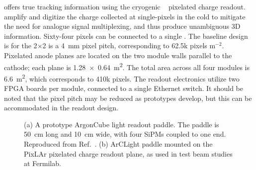  offers true \threed tracking information using the  cryogenic ~\cite{larpix} pixelated charge readout.   amplify and digitize the charge collected at single-pixels in the cold to mitigate the need for analogue signal multiplexing, and thus produce unambiguous 3D information. Sixty-four pixels can be connected to a single  . The baseline design is for the 2$\times$2 is a \SI{4}{\milli\metre} pixel pitch, corresponding to 62.5k pixels m$^{-2}$. Pixelated anode planes are located on the two module walls parallel to the cathode; each plane is \SI[product-units=repeat]{1.28x0.64}{\metre\squared}. The total area across all four modules is \SI{6.6}{\metre\squared}, which corresponds to 410k pixels. The readout electronics utilize two FPGA boards per module, connected to a single Ethernet switch. It should be noted that the pixel pitch may be reduced as prototypes develop, but this can be accommodated in the readout design. 

\begin{figure}[!ht]
	\centering
	\caption{(a) A prototype ArgonCube light readout paddle. The paddle is 50~cm long and 10~cm wide, with four SiPMs coupled to one end. Reproduced from Ref.~\cite{argoncube_loi}. (b) ArCLight paddle mounted on the PixLAr pixelated charge readout plane, as used in test beam studies at Fermilab.}
	\label{fig:arclight}
\end{figure}


